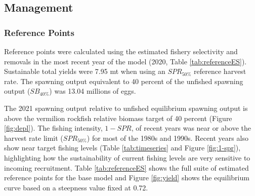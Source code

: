 \documentclass[11pt,
  english,
  a4paper,
]{article}
\begin{document}
\leavevmode\tagmcend\tagstructend\par


\hypertarget{management}{%
\subsection{Management}\label{management}}

\leavevmode\tagmcend\tagstructend


\hypertarget{reference-points-1}{%
\subsubsection{Reference Points}\label{reference-points-1}}

\leavevmode\tagmcend\tagstructend


Reference points were calculated using the estimated fishery selectivity and removals in the most recent year of the model (2020, Table \ref{tab:referenceES}). Sustainable total yields were 7.95 mt when using an {\(SPR_{50\%}\)\leavevmode\tagmcend\tagstructend} reference harvest rate. The spawning output equivalent to 40 percent of the unfished spawning output ({\(SB_{40\%}\)\leavevmode\tagmcend\tagstructend}) was 13.04 millions of eggs.

\leavevmode\tagmcend\tagstructend\par


The 2021 spawning output relative to unfished equilibrium spawning output is above the vermilion rockfish relative biomass target of 40 percent (Figure \ref{fig:depl}). The fishing intensity, {\(1-SPR\)\leavevmode\tagmcend\tagstructend}, of recent years was near or above the harvest rate limit ({\(SPR_{50\%}\)\leavevmode\tagmcend\tagstructend}) for most of the 1980s and 1990s. Recent years also show near target fishing levels (Table \ref{tab:timeseries} and Figure \ref{fig:1-spr}), highlighting how the sustainability of current fishing levels are very sensitive to incoming recruitment. Table \ref{tab:referenceES} shows the full suite of estimated reference points for the base model and Figure \ref{fig:yield} shows the equilibrium curve based on a steepness value fixed at 0.72.
\end{document}
